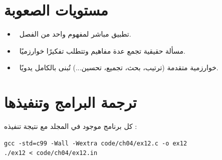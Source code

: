 \section*{مستويات الصعوبة}

\begin{center}
\end{center}

\begin{itemize}
    \item {}\ تطبيق مباشر لمفهوم واحد من الفصل.
    \item {}\ مسألة حقيقية تجمع عدة مفاهيم وتتطلب تفكيرًا خوارزميًا.
    \item {}\ خوارزمية متقدمة (ترتيب، بحث، تجميع، تحسين...) تُبنى بالكامل يدويًا.
\end{itemize}

\section*{ترجمة البرامج وتنفيذها}

كل برنامج موجود في المجلد  مع نتيجة تنفيذه :

\begin{codebox}\begin{english}
\begin{lstlisting}[style=outstyle, numbers=none]
gcc -std=c99 -Wall -Wextra code/ch04/ex12.c -o ex12
./ex12 < code/ch04/ex12.in
\end{lstlisting}
\end{english}\end{codebox}
